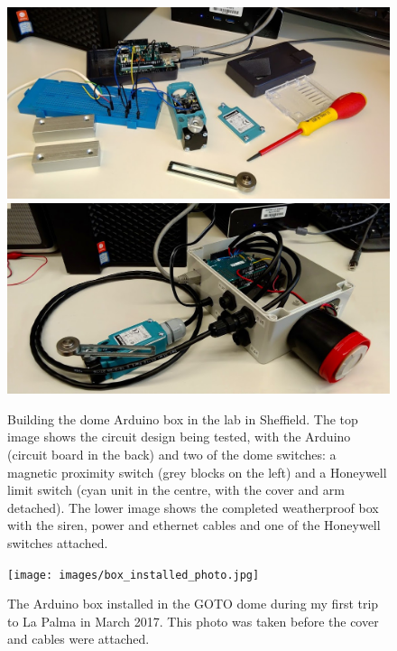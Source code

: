 \begin{colsection}
\begin{colsection}
\begin{figure}[p]
    \begin{center}
        \includegraphics[width=\textwidth]{images/arduino_photo.jpg}
        \includegraphics[width=\textwidth]{images/box_photo.jpg}
    \end{center}
    \caption[Building the dome Arduino box]{
        Building the dome Arduino box in the lab in Sheffield. The top image shows the circuit design being tested, with the Arduino (circuit board in the back) and two of the dome switches: a magnetic proximity switch (grey blocks on the left) and a Honeywell limit switch (cyan unit in the centre, with the cover and arm detached). The lower image shows the completed weatherproof box with the siren, power and ethernet cables and one of the Honeywell switches attached.
    }\label{fig:arduino_wip}
\end{figure}

\newpage

\begin{figure}[p]
    \begin{center}
        \texttt{[image: images/box\_installed\_photo.jpg]}
    \end{center}
    \caption[The Arduino box installed in the GOTO dome]{
        The Arduino box installed in the GOTO dome during my first trip to La Palma in March 2017. This photo was taken before the cover and cables were attached.
    }\label{fig:arduino_installed}
\end{figure}


\end{colsection}
\end{colsection}
